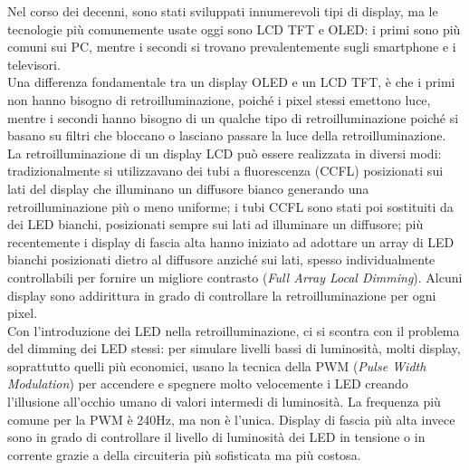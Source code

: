 Nel corso dei decenni, sono stati sviluppati innumerevoli tipi di display, ma le tecnologie più comunemente usate oggi sono LCD TFT e OLED: i primi sono più comuni sui PC, mentre i secondi si trovano prevalentemente sugli smartphone e i televisori.\\
Una differenza fondamentale tra un display OLED e un LCD TFT, è che i primi non hanno bisogno di retroilluminazione, poiché i pixel stessi emettono luce, mentre i secondi hanno bisogno di un qualche tipo di retroilluminazione poiché si basano su filtri che bloccano o lasciano passare la luce della retroilluminazione.\\
La retroilluminazione di un display LCD può essere realizzata in diversi modi: tradizionalmente si utilizzavano dei tubi a fluorescenza (CCFL) posizionati sui lati del display che illuminano un diffusore bianco generando una retroilluminazione più o meno uniforme; i tubi CCFL sono stati poi sostituiti da dei LED bianchi, posizionati sempre sui lati ad illuminare un diffusore; più recentemente i display di fascia alta hanno iniziato ad adottare un array di LED bianchi posizionati dietro al diffusore anziché sui lati, spesso individualmente controllabili per fornire un migliore contrasto (\textit{Full Array Local Dimming}\cite{localdimming}). Alcuni display sono addirittura in grado di controllare la retroilluminazione per ogni pixel\cite{localdimming2}.\\
Con l'introduzione dei LED nella retroilluminazione, ci si scontra con il problema del dimming dei LED stessi: per simulare livelli bassi di luminosità, molti display, soprattutto quelli più economici, usano la tecnica della PWM (\textit{Pulse Width Modulation}\cite{pwm_backlight}) per accendere e spegnere molto velocemente i LED creando l'illusione all'occhio umano di valori intermedi di luminosità. La frequenza più comune per la PWM è 240Hz, ma non è l'unica. Display di fascia più alta invece sono in grado di controllare il livello di luminosità dei LED in tensione o in corrente grazie a della circuiteria più sofisticata ma più costosa.

